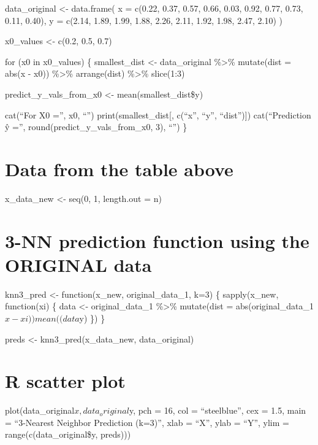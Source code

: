 \documentclass[
  letterpaper,
  DIV=11,
  numbers=noendperiod]{scrreprt}
\begin{document}
{data\_original \textless- data.frame( x = c(0.22, 0.37, 0.57, 0.66,
0.03, 0.92, 0.77, 0.73, 0.11, 0.40), y = c(2.14, 1.89, 1.99, 1.88, 2.26,
2.11, 1.92, 1.98, 2.47, 2.10) )

x0\_values \textless- c(0.2, 0.5, 0.7)

for (x0 in x0\_values) \{ smallest\_dist \textless- data\_original
\%\textgreater\% mutate(dist = abs(x - x0)) \%\textgreater\%
arrange(dist) \%\textgreater\% slice(1:3)

predict\_y\_vals\_from\_x0 \textless- mean(smallest\_dist\$y)

cat(``For X0 ='', x0, ``\n'') print(smallest\_dist{[}, c(``x'', ``y'',
``dist''){]}) cat(``Prediction ŷ ='', round(predict\_y\_vals\_from\_x0,
3), ``\n\n'') \}


\chapter{Data from the table above}\label{data-from-the-table-above}

x\_data\_new \textless- seq(0, 1, length.out = n)


\chapter{3-NN prediction function using the ORIGINAL
data}\label{nn-prediction-function-using-the-original-data}

knn3\_pred \textless- function(x\_new, original\_data\_1, k=3) \{
sapply(x\_new, function(xi) \{ data \textless- original\_data\_1
\%\textgreater\% mutate(dist = abs(original\_data\_1\(x - xi))
    mean((data %
\)y) \}) \}

preds \textless- knn3\_pred(x\_data\_new, data\_original)


\chapter{R scatter plot}\label{r-scatter-plot}

plot(data\_original\(x, data_original\)y, pch = 16, col = ``steelblue'',
cex = 1.5, main = ``3-Nearest Neighbor Prediction (k=3)'', xlab = ``X'',
ylab = ``Y'', ylim = range(c(data\_original\$y, preds)))


}
\end{document}
